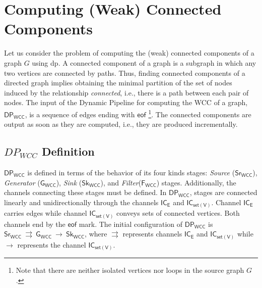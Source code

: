 \documentclass[preprint]{elsarticle}
\newcommand{\dpwcc}{\mathsf{DP_{WCC}}}
\newcommand{\iwc}{\mathsf{Sr_{WCC}}}
\newcommand{\owc}{\mathsf{Sk_{WCC}}}
\newcommand{\fwc}{\mathsf{F_{WCC}}}
\newcommand{\gwc}{\mathsf{G_{WCC}}}
\newcommand{\ice}{\mathsf{IC_E}}
\newcommand{\csofv}{\mathsf{IC_{set(V)}}}
\newcommand{\eof}{\mathsf{eof}}
\begin{document}
\section{Computing (Weak) Connected Components}\label{WCC-1}
%
Let us consider the problem of computing the (weak) connected components of a graph $G$ using \acrshort{dp}. A connected component of a graph is a subgraph in which any two vertices are connected by paths. Thus, finding connected components of a directed graph implies obtaining the minimal partition of the set of nodes induced by the relationship \textit{connected}, i.e., there is a path between each pair of nodes. The input of the Dynamic Pipeline for computing the WCC of a graph, $\dpwcc$, is a sequence of edges ending with $\eof$%
\footnote{Note that there are neither isolated vertices nor loops in the source graph $G$.}. The connected components are output as soon as they are computed, i.e., they are produced incrementally. 
%
\subsection{$DP_{WCC}$ Definition}\label{sub:sec:mot:ex}\label{WCC}
$\dpwcc$ is defined in terms of the behavior of its four kinds stages: \textit{Source} ($\iwc$),  \textit{Generator} ($\gwc$),  \textit{Sink} ($\owc$), and \textit{Filter}($\fwc$) stages. Additionally,  the channels connecting these stages must be defined. In $\dpwcc$, stages are connected linearly and unidirectionally through the channels $\ice$ and  $\csofv$. Channel $\ice$ carries edges while channel  $\csofv$ conveys sets of connected vertices. Both channels end by the $\eof$ mark. The initial configuration of $\dpwcc$ is $\iwc \:\rightrightarrows\:\gwc \:\rightarrow \: \owc$, where $\rightrightarrows$ represents  channels $\ice$ and $\csofv$ while $\rightarrow$ represents the channel $\csofv$.
 
\end{document}
